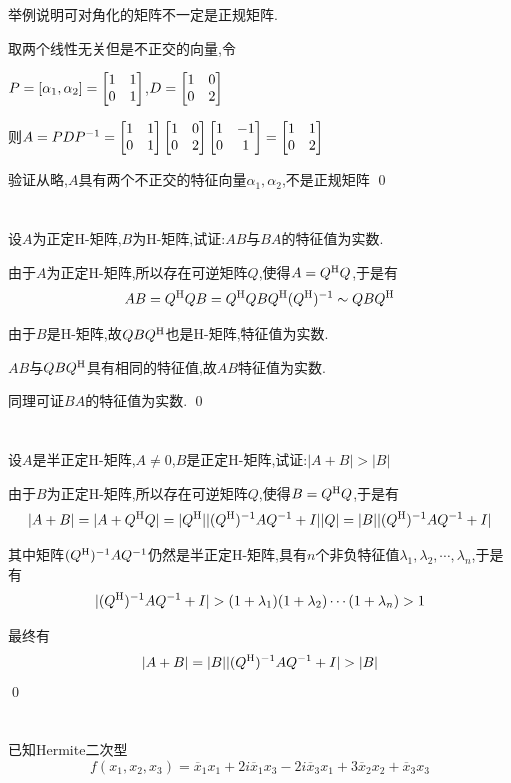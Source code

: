 \documentclass{matrix-homework}
\begin{document}

\section{}
举例说明可对角化的矩阵不一定是正规矩阵.

\answer
取两个线性无关但是不正交的向量,令

$P=[\alpha_1,\alpha_2]=\begin{bmatrix}1&1\\0&1\end{bmatrix}$,$D=\begin{bmatrix}1&0\\0&2\end{bmatrix}$

则$A=PDP^{-1}=\begin{bmatrix}1&1\\0&1\end{bmatrix}\begin{bmatrix}1&0\\0&2\end{bmatrix}\begin{bmatrix}1&-1\\0&1\end{bmatrix}=\begin{bmatrix}1&1\\0&2\end{bmatrix}$

验证从略,$A$具有两个不正交的特征向量$\alpha_1,\alpha_2$,不是正规矩阵
\qed


\section{}
设$A$为正定H-矩阵,$B$为H-矩阵,试证:$AB$与$BA$的特征值为实数.

\answer
由于$A$为正定H-矩阵,所以存在可逆矩阵$Q$,使得$A=Q^{\mathrm{H}} Q$,于是有
$$AB=Q^{\mathrm{H}} Q B= Q^{\mathrm{H}} QB Q^{\mathrm{H}} (Q^{\mathrm{H}})^{-1} \sim QBQ^{\mathrm{H}}$$

由于$B$是H-矩阵,故$QBQ^{\mathrm{H}}$也是H-矩阵,特征值为实数.

$AB$与$QBQ^{\mathrm{H}}$具有相同的特征值,故$AB$特征值为实数.

同理可证$BA$的特征值为实数.
\qed

\newpage
\section{}
设$A$是半正定H-矩阵,$A\ne 0$,$B$是正定H-矩阵,试证:$|A+B| >|B|$

\answer
由于$B$为正定H-矩阵,所以存在可逆矩阵$Q$,使得$B=Q^{\mathrm{H}} Q$,于是有
$$|A+B|= |A+Q^{\mathrm{H}} Q| = |Q^{\mathrm{H}}| |(Q^{\mathrm{H}})^{-1}AQ^{-1}+I| |Q| = |B| |(Q^{\mathrm{H}})^{-1}AQ^{-1}+I|$$

其中矩阵$(Q^{\mathrm{H}})^{-1}AQ^{-1}$仍然是半正定H-矩阵,具有$n$个非负特征值$\lambda_1,\lambda_2,\cdots,\lambda_n$,于是有
$$|(Q^{\mathrm{H}})^{-1}AQ^{-1}+I| > (1+\lambda_1)(1+\lambda_2)\cdots(1+\lambda_n)>1$$

最终有
$$|A+B|= |B| |(Q^{\mathrm{H}})^{-1}AQ^{-1}+I| > |B|$$
\qed

\section{}
\newcommand{\xx}[2]{\overline{x}_{#1}x_{#2}}
已知Hermite二次型
$$f(x_1,x_2,x_3)=\xx{1}{1}+2i\xx{1}{3}-2i\xx{3}{1}+3\xx{2}{2}+\xx{3}{3}$$
\end{document}
